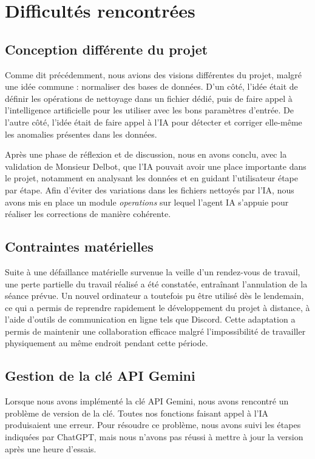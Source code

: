 \documentclass[a4paper, 12pt, twoside]{article}
\begin{document}
\newpage
\section{Difficultés rencontrées}
    \subsection{Conception différente du projet}
Comme dit précédemment, nous avions des visions différentes du projet, malgré une idée commune : normaliser des bases de données.  
D’un côté, l’idée était de définir les opérations de nettoyage dans un fichier dédié, puis de faire appel à l’intelligence artificielle pour les utiliser avec les bons paramètres d’entrée.  
De l’autre côté, l’idée était de faire appel à l’IA pour détecter et corriger elle-même les anomalies présentes dans les données.

Après une phase de réflexion et de discussion, nous en avons conclu, avec la validation de Monsieur Delbot, que l’IA pouvait avoir une place importante dans le projet, notamment en analysant les données et en guidant l’utilisateur étape par étape. Afin d’éviter des variations dans les fichiers nettoyés par l’IA, nous avons mis en place un module \textit{operations} sur lequel l’agent IA s’appuie pour réaliser les corrections de manière cohérente.

    \subsection{Contraintes matérielles}
Suite à une défaillance matérielle survenue la veille d’un rendez-vous de travail, une perte partielle du travail réalisé a été constatée, entraînant l’annulation de la séance prévue. Un nouvel ordinateur a toutefois pu être utilisé dès le lendemain, ce qui a permis de reprendre rapidement le développement du projet à distance, à l’aide d’outils de communication en ligne tels que Discord. Cette adaptation a permis de maintenir une collaboration efficace malgré l’impossibilité de travailler physiquement au même endroit pendant cette période.

    \subsection{Gestion de la clé API Gemini}
Lorsque nous avons implémenté la clé API Gemini, nous avons rencontré un problème de version de la clé. Toutes nos fonctions faisant appel à l’IA produisaient une erreur. Pour résoudre ce problème, nous avons suivi les étapes indiquées par ChatGPT, mais nous n’avons pas réussi à mettre à jour la version après une heure d’essais.
\end{document}
